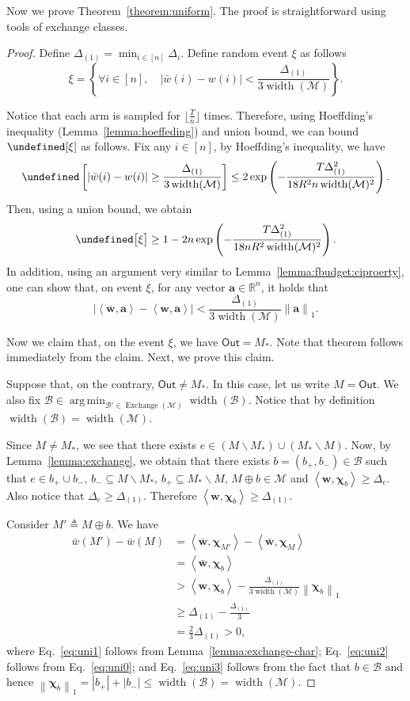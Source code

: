 \documentclass{article}
\newcommand{\M}{\mathcal M}
\newcommand{\B}{\mathcal B}
\newcommand{\del}{\backslash}
\newcommand{\RR}{\mathbb R}
\DeclareMathOperator{\rank}{width}
\DeclareMathOperator*{\argmin}{arg\,min}
\DeclareMathOperator{\Exchange}{Exchange}
\newcommand{\out}{\mathsf{Out}}
\let\Pr\undefined
\DeclareMathOperator{\Pr}{Pr}
\newcommand{\inn}[1]{\left\langle #1 \right\rangle}
\newcommand{\nor}[1]{\left\|#1\right\|}
\renewcommand{\vec}[1]{\boldsymbol{#1}}
\begin{document}
Now we prove Theorem~\ref{theorem:uniform}. 
The proof is straightforward using tools of exchange classes.
\begin{proof}
Define $\Delta_{(1)} = \min_{i\in [n]} \Delta_{i}$.
Define random event $\xi$ as follows
$$
\xi = \left\{ \forall i\in [n], \quad |\bar w(i) - w(i)| < \frac{\Delta_{(1)}}{3\rank(\M)} \right\}.
$$

Notice that each arm is sampled for $\lfloor \frac{T}{n} \rfloor$ times. 
Therefore, using Hoeffding's inequality (Lemma~\ref{lemma:hoeffeding}) and union bound, we can bound $\Pr[\xi]$ as follows.
Fix any $i\in[n]$, by Hoeffding's inequality, we have
$$
\Pr\left[ |\bar w(i)-w(i)| \ge  \frac{\Delta_{(1)}}{3\rank(\M)} \right] 
\le 2\exp\left(-\frac{T\Delta_{(1)}^2}{18R^2n\rank(\M)^2} \right).
$$
Then, using a union bound, we obtain
$$
\Pr\big[\xi \big] \ge 1-2n\exp\left(-\frac{T\Delta_{(1)}^2}{18 nR^2\rank(\M)^2} \right).
$$
In addition, using an argument very similar to Lemma~\ref{lemma:fbudget:ciproerty}, one can show that, on event $\xi$, for any vector $\vec a \in \RR^n$, it holds that 
\begin{equation}
\label{eq:uni0}
|\inn{\vec{\bar w}, \vec a}-\inn{\vec{w}, \vec a}|< \frac{\Delta_{(1)}}{3\rank(\M)}\nor{\vec a}_1.
\end{equation}

Now we claim that, on the event $\xi$, we have $\out=M_*$.
Note that theorem follows immediately from the claim. 
Next, we prove this claim.


Suppose that, on the contrary, $\out\not=M_*$.
In this case, let us write $M = \out$.
We also fix $\B\in\argmin_{\B'\in\Exchange(\M)} \rank(\B)$.
Notice that by definition $\rank(\B) = \rank(\M)$.

Since $M\not=M_*$, we see that there exists $e\in (M\del M_*) \cup (M_*\del M)$. 
Now, by Lemma~\ref{lemma:exchange}, we obtain that 
there exists $b=(b_+,b_-) \in \B$ such that $e\in b_+\cup b_-$, $b_- \subseteq M\del M_*$, $b_+\subseteq M_* \del M$,
$M \oplus b \in \M$ and $\inn{\vec w, \vec\chi_b} \ge \Delta_e$. Also notice that $\Delta_e \ge \Delta_{(1)}$. Therefore $\inn{\vec w,\vec\chi_b} \ge \Delta_{(1)}$.

Consider $M'\triangleq M\oplus b$. We have
\begin{align}
\bar w(M')-\bar w(M) &= \inn{\vec{\bar w}, \vec \chi_{M'}}-\inn{\vec{\bar w}, \vec \chi_{M}} \nonumber\\
                     &=\inn{\vec{\bar w}, \vec \chi_{b}} \label{eq:uni1} \\
                     &> \inn{\vec{w}, \vec \chi_{b}}-\frac{\Delta_{(1)}}{3\rank(\M)} \nor{\vec\chi_{b}}_1 \label{eq:uni2}\\
                     &\ge \Delta_{(1)} - \frac{\Delta_{(1)}}{3}\label{eq:uni3}\\
                     &= \frac{2}{3} \Delta_{(1)} > 0,
\end{align}
where Eq.~\eqref{eq:uni1} follows from Lemma~\ref{lemma:exchange-char}; Eq.~\eqref{eq:uni2} follows from Eq.~\eqref{eq:uni0}; and Eq.~\eqref{eq:uni3} follows from the fact that $b\in \B$ and hence $\nor{\vec\chi_b}_1 = |b_+|+|b_-| \le \rank(\B) = \rank(\M)$.


\end{proof}
\end{document}
